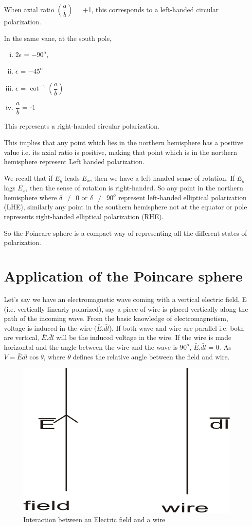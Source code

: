 When axial ratio $(\dfrac{a}{b})$ = +1, this corresponds to a left-handed circular polarization.

In the same vane, at the south pole,
\begin{enumerate}[(i)]
\item	$2\epsilon$ = $-90^{o}$, 
\item $\epsilon$ = $-45^{o}$
\item $\epsilon$ = $\cot^{-1}(\dfrac{a}{b})$
\item $\dfrac{a}{b}$ = -1
\end{enumerate}	
This represents a right-handed circular polarization.

This implies that any point which lies in the northern hemisphere has a positive value i.e. its axial ratio is positive, making that point which is in the northern hemisphere represent Left handed polarization.

We recall that if $E_{y}$ leads $E_{x}$, then we have a left-handed sense of rotation. If $E_{y}$ lags $E_{x}$, then the sense of rotation is right-handed. So any point in the northern hemisphere where $\delta$ $\neq$ 0 or $\delta$ $\neq$ $90^{o}$ represent left-handed elliptical polarization  (LHE), similarly any point in the southern hemisphere not at the equator or pole represents right-handed elliptical polarization (RHE).

So the Poincare sphere is a compact way of representing all the different states of polarization.

\section{Application of the Poincare sphere}
Let's say we have an electromagnetic wave coming with a vertical electric field, E (i.e. vertically linearly polarized), say a piece of wire is placed vertically along the path of the incoming wave. From the basic knowledge of electromagnetism, voltage is induced in the wire ($\bar{E}$.$\bar{dl}$). If both wave and wire are parallel i.e. both are vertical, $\bar{E}$.$\bar{dl}$ will be the induced voltage in the wire. If the wire is made horizontal and the angle between the wire and the wave is $90^{o}$, $\bar{E}$.$\bar{dl}$ = 0. As $ V = \bar{E}dl\cos\theta $, where $ \theta $ defines the relative angle between the field and wire.
\begin{figure}[h]
\centering
\includegraphics[width=.7\linewidth]{./graphics/interact}
\caption{Interaction between an Electric field and a wire}
\label{fig:interact}
\end{figure}

